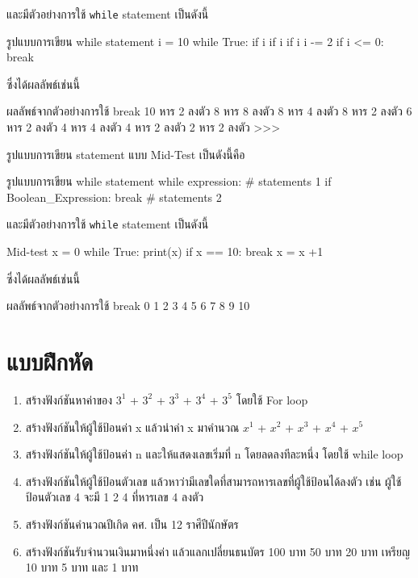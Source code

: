 และมีตัวอย่างการใช้ \texttt{while} statement เป็นดังนี้

\begin{codelist}{รูปแบบการเขียน while statement}{}
i = 10
while True:
    if i %
    if i %
    if i %
    i -= 2
    if i <= 0: break
\end{codelist}

ซึ่งได้ผลลัพธ์เช่นนี้
\begin{codelist}{ผลลัพธ์จากตัวอย่างการใช้ break}{}
10 หาร 2 ลงตัว
8 หาร 8 ลงตัว
8 หาร 4 ลงตัว
8 หาร 2 ลงตัว
6 หาร 2 ลงตัว
4 หาร 4 ลงตัว
4 หาร 2 ลงตัว
2 หาร 2 ลงตัว
>>>
\end{codelist}

รูปแบบการเขียน   statement แบบ Mid-Test เป็นดังนี้คือ

\begin{codelist}{รูปแบบการเขียน while statement}{}
while expression:
    # statements 1
    if Boolean_Expression: break
    # statements 2
    
\end{codelist}

และมีตัวอย่างการใช้ \texttt{while} statement เป็นดังนี้

\begin{codelist}{Mid-test}{}
x = 0
while True:
    print(x)
    if x == 10: break
    x = x +1
\end{codelist}

ซึ่งได้ผลลัพธ์เช่นนี้
\begin{codelist}{ผลลัพธ์จากตัวอย่างการใช้ break}{}
0
1
2
3
4
5
6
7
8
9
10
\end{codelist}





\section{แบบฝึกหัด}
\begin{enumerate} 

\item 	สร้างฟังก์ชันหาค่าของ  $3^1$ + $3^2$ + $3^3$ + $3^4$ + $3^5$  โดยใช้ For loop
\item 	สร้างฟังก์ชันให้ผู้ใช้ป้อนค่า x แล้วนำค่า x มาคำนวณ $x^1$ + $x^2$ + $x^3$ + $x^4$ + $x^5$
\item 	สร้างฟังก์ชันให้ผู้ใช้ป้อนค่า n และให้แสดงเลขเริ่มที่ n โดยลดลงทีละหนึ่ง โดยใช้ while loop
\item 	สร้างฟังก์ชันให้ผู้ใช้ป้อนตัวเลข แล้วหาว่ามีเลขใดที่สามารถหารเลขที่ผู้ใช้ป้อนได้ลงตัว เช่น ผู้ใช้ป้อนตัวเลข 4 จะมี 1 2 4 ที่หารเลข 4 ลงตัว
\item 	สร้างฟังก์ชันคำนวณปีเกิด คศ. เป็น 12 ราศีปีนักษัตร
\item 	สร้างฟังก์ชันรับจำนวนเงินมาหนึ่งค่า แล้วแลกเปลี่ยนธนบัตร 100 บาท 50 บาท 20 บาท เหรียญ 10 บาท 5 บาท และ 1 บาท
\end{enumerate}